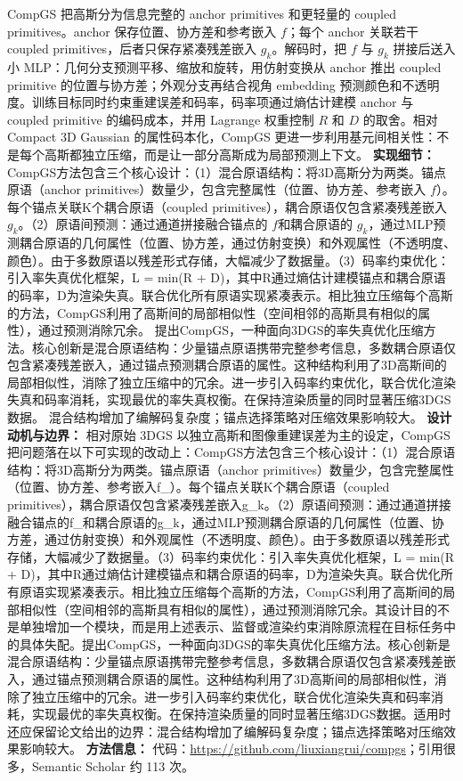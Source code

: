 CompGS 把高斯分为信息完整的 anchor primitives 和更轻量的 coupled primitives。anchor 保存位置、协方差和参考嵌入 $f$；每个 anchor 关联若干 coupled primitives，后者只保存紧凑残差嵌入 $g_k$。解码时，把 $f$ 与 $g_k$ 拼接后送入小 MLP：几何分支预测平移、缩放和旋转，用仿射变换从 anchor 推出 coupled primitive 的位置与协方差；外观分支再结合视角 embedding 预测颜色和不透明度。训练目标同时约束重建误差和码率，码率项通过熵估计建模 anchor 与 coupled primitive 的编码成本，并用 Lagrange 权重控制 $R$ 和 $D$ 的取舍。相对 Compact 3D Gaussian 的属性码本化，CompGS 更进一步利用基元间相关性：不是每个高斯都独立压缩，而是让一部分高斯成为局部预测上下文。
\textbf{实现细节：} CompGS方法包含三个核心设计：（1）混合原语结构：将3D高斯分为两类。锚点原语（anchor primitives）数量少，包含完整属性（位置、协方差、参考嵌入 $f$）。每个锚点关联K个耦合原语（coupled primitives），耦合原语仅包含紧凑残差嵌入 $g_k$。（2）原语间预测：通过通道拼接融合锚点的 $f$和耦合原语的 $g_k$，通过MLP预测耦合原语的几何属性（位置、协方差，通过仿射变换）和外观属性（不透明度、颜色）。由于多数原语以残差形式存储，大幅减少了数据量。（3）码率约束优化：引入率失真优化框架，L = min(R + D)，其中R通过熵估计建模锚点和耦合原语的码率，D为渲染失真。联合优化所有原语实现紧凑表示。相比独立压缩每个高斯的方法，CompGS利用了高斯间的局部相似性（空间相邻的高斯具有相似的属性），通过预测消除冗余。 提出CompGS，一种面向3DGS的率失真优化压缩方法。核心创新是混合原语结构：少量锚点原语携带完整参考信息，多数耦合原语仅包含紧凑残差嵌入，通过锚点预测耦合原语的属性。这种结构利用了3D高斯间的局部相似性，消除了独立压缩中的冗余。进一步引入码率约束优化，联合优化渲染失真和码率消耗，实现最优的率失真权衡。在保持渲染质量的同时显著压缩3DGS数据。 混合结构增加了编解码复杂度；锚点选择策略对压缩效果影响较大。
\textbf{设计动机与边界：} 相对原始 3DGS 以独立高斯和图像重建误差为主的设定，CompGS 把问题落在以下可实现的改动上：CompGS方法包含三个核心设计：（1）混合原语结构：将3D高斯分为两类。锚点原语（anchor primitives）数量少，包含完整属性（位置、协方差、参考嵌入f\_）。每个锚点关联K个耦合原语（coupled primitives），耦合原语仅包含紧凑残差嵌入g\_k。（2）原语间预测：通过通道拼接融合锚点的f\_和耦合原语的g\_k，通过MLP预测耦合原语的几何属性（位置、协方差，通过仿射变换）和外观属性（不透明度、颜色）。由于多数原语以残差形式存储，大幅减少了数据量。（3）码率约束优化：引入率失真优化框架，L = min(R + D)，其中R通过熵估计建模锚点和耦合原语的码率，D为渲染失真。联合优化所有原语实现紧凑表示。相比独立压缩每个高斯的方法，CompGS利用了高斯间的局部相似性（空间相邻的高斯具有相似的属性），通过预测消除冗余。其设计目的不是单独增加一个模块，而是用上述表示、监督或渲染约束消除原流程在目标任务中的具体失配。提出CompGS，一种面向3DGS的率失真优化压缩方法。核心创新是混合原语结构：少量锚点原语携带完整参考信息，多数耦合原语仅包含紧凑残差嵌入，通过锚点预测耦合原语的属性。这种结构利用了3D高斯间的局部相似性，消除了独立压缩中的冗余。进一步引入码率约束优化，联合优化渲染失真和码率消耗，实现最优的率失真权衡。在保持渲染质量的同时显著压缩3DGS数据。适用时还应保留论文给出的边界：混合结构增加了编解码复杂度；锚点选择策略对压缩效果影响较大。
\textbf{方法信息：} 代码：\url{https://github.com/liuxiangrui/compgs}；引用很多，Semantic Scholar 约 113 次。



